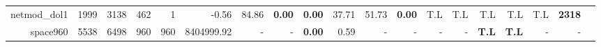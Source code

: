 \begin{table*}[t]
\begin{tabular}{|r|r|r|r|r||r||r|r|r|r|r|r||r|r|r|r|r|r|r|}
                   netmod\_dol1 &         1999 &         3138 &         462 &            1 &              -0.56 &         84.86 &\textbf{0.00} &  \textbf{0.00} &         37.71 &          51.73 & \textbf{0.00} &          T.L &          T.L &                T.L &          T.L &         T.L &\textbf{2318} \\ 
                       space960 &         5538 &         6498 &         960 &          960 &         8404999.92 &             - &            - &  \textbf{0.00} &          0.59 &              - &             - &            - &            - &       \textbf{T.L} & \textbf{T.L} &           - &            - \\ 
\hline 
\end{tabular}\\ 
\label{table:results} 
\end{table*} 

